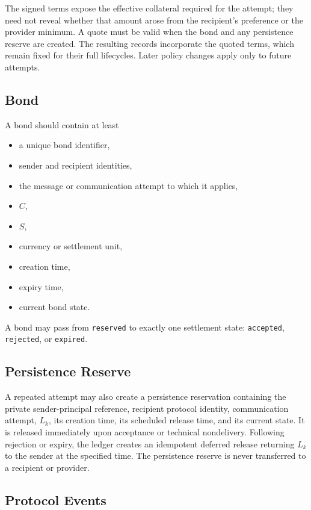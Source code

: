 \documentclass[11pt]{article}
\begin{document}
The signed terms expose the effective collateral required for the attempt; they need not reveal whether that amount arose from the recipient's preference or the provider minimum. A quote must be valid when the bond and any persistence reserve are created. The resulting records incorporate the quoted terms, which remain fixed for their full lifecycles. Later policy changes apply only to future attempts.

\subsection{Bond}

A bond should contain at least

\begin{itemize}[leftmargin=2em]
    \item a unique bond identifier,
    \item sender and recipient identities,
    \item the message or communication attempt to which it applies,
    \item $C$,
    \item $S$,
    \item currency or settlement unit,
    \item creation time,
    \item expiry time,
    \item current bond state.
\end{itemize}

A bond may pass from \texttt{reserved} to exactly one settlement state: \texttt{accepted}, \texttt{rejected}, or \texttt{expired}.

\subsection{Persistence Reserve}

A repeated attempt may also create a persistence reservation containing the private sender-principal reference, recipient protocol identity, communication attempt, $L_k$, its creation time, its scheduled release time, and its current state. It is released immediately upon acceptance or technical nondelivery. Following rejection or expiry, the ledger creates an idempotent deferred release returning $L_k$ to the sender at the specified time. The persistence reserve is never transferred to a recipient or provider.

\subsection{Protocol Events}
\end{document}
